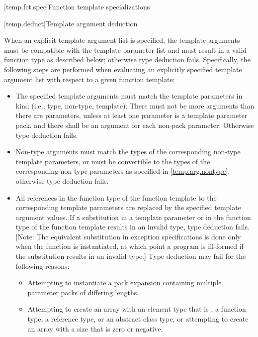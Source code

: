 \documentclass[american]{book}
\begin{document}
\begin{paras}
[temp.fct.spec]{Function template specializations}

\setcounter{subsection}{1}
[temp.deduct]{Template argument deduction}
\setcounter{Paras}{1}
\pnum
{}

\pnum
When an explicit template argument list is specified, the template
arguments must be compatible with the template parameter list and must
result in a valid function type as described below; otherwise type
deduction fails.  Specifically, the following steps are performed when
evaluating an explicitly specified template argument list with respect
to a given function template:

\begin{itemize}
\item
The specified template arguments must match the template parameters in
kind (i.e., type, non-type, template). There must not be more
arguments than there are parameters, unless at least one parameter is
a template parameter pack, and there shall be an argument for each
non-pack parameter. Otherwise type deduction fails.
\item
Non-type arguments must match the types of the corresponding non-type
template parameters, or must be convertible to the types of the
corresponding non-type parameters as specified in
\ref{temp.arg.nontype}, otherwise type deduction fails.
\item
All references in the function type  of the function template to the
corresponding template parameters are replaced by the specified
template argument values.  If a substitution in a template
parameter
or in the function type of the function template results in an invalid
type, type deduction fails.  [Note: The equivalent substitution in
exception specifications is done only when the function is
instantiated, at which point a program is ill-formed if the
substitution results in an invalid type.] Type deduction may fail for
the following reasons:

\begin{itemize}
\item
Attempting to instantiate a pack expansion containing
multiple parameter packs of differing lengths.

\item
Attempting to create an array with an element type that is , a
function type, a reference type, or an abstract class type, or attempting
to create an array with a size that is zero or negative.
\enterexample\ 


\end{itemize}
\end{itemize}
\end{paras}
\end{document}
